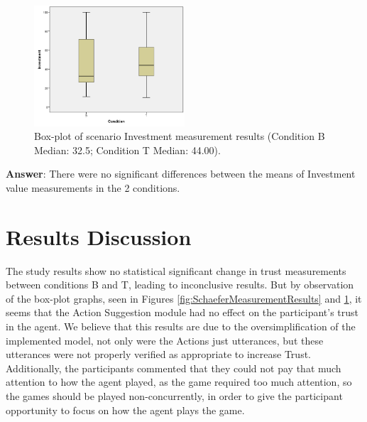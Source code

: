 \begin{figure}[hbt]
    \centering
    \includegraphics[width=0.5\textwidth]{graphs/InvestmentBoxPlot.png}
    \caption{Box-plot of scenario Investment measurement results (Condition B Median: 32.5; Condition T Median: 44.00).}
    \label{fig:InvestmentBoxPlot}
\end{figure}

\textbf{Answer}: There were no significant differences between the means of Investment value measurements in the 2 conditions.

\section{Results Discussion}
The study results show no statistical significant change in trust measurements between conditions B and T, leading to inconclusive results. But by observation of the box-plot graphs, seen in Figures \ref{fig:SchaeferMeasurementResults} and \ref{fig:InvestmentBoxPlot}, it seems that the Action Suggestion module had no effect on the participant's trust in the agent.
We believe that this results are due to the oversimplification of the implemented model, not only were the Actions just utterances, but these utterances were not properly verified as appropriate to increase Trust. Additionally, the participants commented that they could not pay that much attention to how the agent played, as the game required too much attention, so the games should be played non-concurrently, in order to give the participant opportunity to focus on how the agent plays the game.
